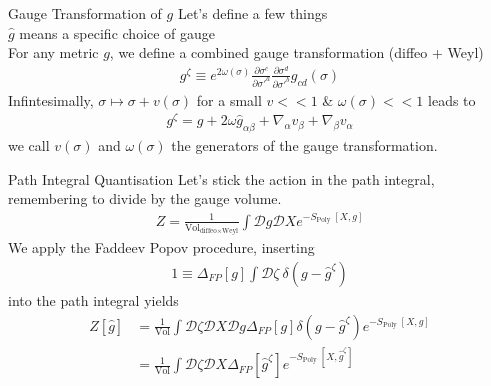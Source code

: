 \documentclass{beamer}
\begin{document}
\begin{frame}{Gauge Transformation of $g$}
    Let's define a few things \newline \\
    $\hat{g}$ means a specific choice of gauge
    \newline \\
    For any metric $g$, we define a combined gauge transformation (diffeo + Weyl)
    \begin{align}
        g^\zeta \equiv e^{2\omega(\sigma)} \frac{\partial \sigma^c }{\partial \sigma'^a} \frac{\partial \sigma^d}{\partial \sigma'^b} g_{cd}(\sigma)
    \end{align}
    Infintesimally, $\sigma \mapsto \sigma + v(\sigma)$ for a small $v<<1$ \& $\omega(\sigma) << 1$ leads to
    \begin{align}
        g^\zeta = g+2 \omega \hat{g}_{\alpha \beta}+\nabla_\alpha v_\beta+\nabla_\beta v_\alpha
    \end{align}
    we call $v(\sigma)$ and $\omega(\sigma)$ the generators of the gauge transformation.
\end{frame}
\begin{frame}{Path Integral Quantisation}
    Let's stick the action in the path integral, remembering to divide by the gauge volume. 
    \begin{align}
        Z=\frac{1}{\mathrm{Vol}_{\text{diffeo}\times\text{Weyl}}} \int \mathcal{D} g \mathcal{D} X e^{-S_{\text {Poly }}[X, g]}
    \end{align}
    We apply the Faddeev Popov procedure, inserting 
    \begin{align}
        1\equiv\Delta_{F P}[g] \int \mathcal{D} \zeta\ \delta\left(g-\hat{g}^\zeta\right)
    \end{align}
    into the path integral yields
    \begin{align}
Z[\hat{g}] & =\frac{1}{\mathrm{Vol}} \int \mathcal{D} \zeta \mathcal{D} X \mathcal{D} g \Delta_{F P}[g] \delta\left(g-\hat{g}^\zeta\right) e^{-S_{\text {Poly }}[X, g]} \\
& =\frac{1}{\mathrm{Vol}} \int \mathcal{D} \zeta \mathcal{D} X \Delta_{F P}[\hat{g}^\zeta] e^{-S_{\text {Poly }}\left[X, \hat{g}^\zeta\right]}
    \end{align}
\end{frame}
\end{document}
